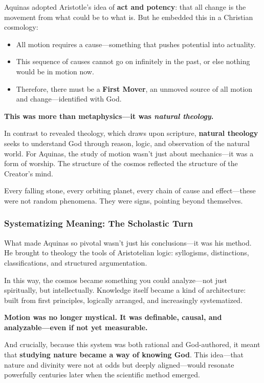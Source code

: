 Aquinas adopted Aristotle’s idea of \textbf{act and potency}: that all change is the movement from what could be to what is. But he embedded this in a Christian cosmology:

\begin{itemize}
    \item All motion requires a cause—something that pushes potential into actuality.
    \item This sequence of causes cannot go on infinitely in the past, or else nothing would be in motion now.
    \item Therefore, there must be a \textbf{First Mover}, an unmoved source of all motion and change—identified with God.
\end{itemize}

\textbf{This was more than metaphysics—it was \textit{natural theology}.}

In contrast to revealed theology, which draws upon scripture, \textbf{natural theology} seeks to understand God through reason, logic, and observation of the natural world. For Aquinas, the study of motion wasn’t just about mechanics—it was a form of worship. The structure of the cosmos reflected the structure of the Creator’s mind.

Every falling stone, every orbiting planet, every chain of cause and effect—these were not random phenomena. They were signs, pointing beyond themselves.

\subsubsection*{Systematizing Meaning: The Scholastic Turn}

What made Aquinas so pivotal wasn’t just his conclusions—it was his method. He brought to theology the tools of Aristotelian logic: syllogisms, distinctions, classifications, and structured argumentation.  

In this way, the cosmos became something you could analyze—not just spiritually, but intellectually. Knowledge itself became a kind of architecture: built from first principles, logically arranged, and increasingly systematized.

\textbf{Motion was no longer mystical. It was definable, causal, and analyzable—even if not yet measurable.}

And crucially, because this system was both rational and God-authored, it meant that \textbf{studying nature became a way of knowing God}. This idea—that nature and divinity were not at odds but deeply aligned—would resonate powerfully centuries later when the scientific method emerged.

